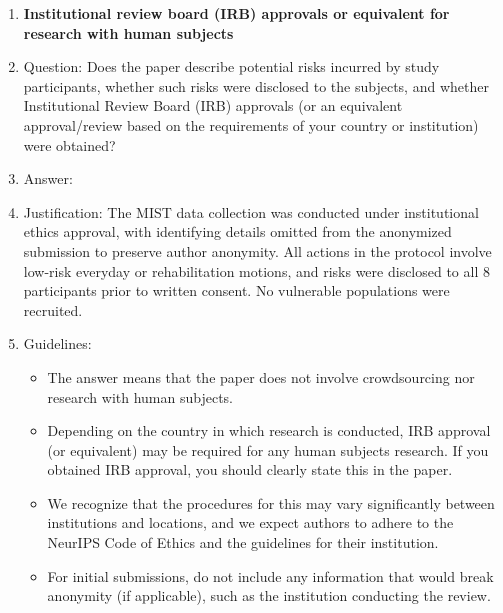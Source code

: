 \begin{enumerate}
\item {\bf Institutional review board (IRB) approvals or equivalent for research with human subjects}
    \item[] Question: Does the paper describe potential risks incurred by study participants, whether such risks were disclosed to the subjects, and whether Institutional Review Board (IRB) approvals (or an equivalent approval/review based on the requirements of your country or institution) were obtained?
    \item[] Answer: \answerYes{}
    \item[] Justification: The MIST data collection was conducted under institutional ethics approval, with identifying details omitted from the anonymized submission to preserve author anonymity. All actions in the protocol involve low-risk everyday or rehabilitation motions, and risks were disclosed to all 8 participants prior to written consent. No vulnerable populations were recruited.
    \item[] Guidelines:
    \begin{itemize}
        \item The answer \answerNA{} means that the paper does not involve crowdsourcing nor research with human subjects.
        \item Depending on the country in which research is conducted, IRB approval (or equivalent) may be required for any human subjects research. If you obtained IRB approval, you should clearly state this in the paper.
        \item We recognize that the procedures for this may vary significantly between institutions and locations, and we expect authors to adhere to the NeurIPS Code of Ethics and the guidelines for their institution.
        \item For initial submissions, do not include any information that would break anonymity (if applicable), such as the institution conducting the review.
    \end{itemize}


\end{enumerate}
